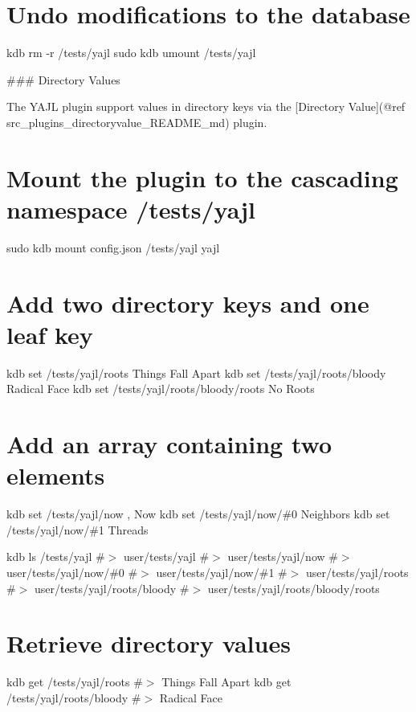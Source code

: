 \section*{Undo modifications to the database}

kdb rm -\/r /tests/yajl sudo kdb umount /tests/yajl 
\begin{DoxyCode}
### Directory Values

The YAJL plugin support values in directory keys via the [Directory Value](@ref
       src\_plugins\_directoryvalue\_README\_md) plugin.
\end{DoxyCode}
 \section*{Mount the plugin to the cascading namespace {\ttfamily /tests/yajl}}

sudo kdb mount config.\+json /tests/yajl yajl

\section*{Add two directory keys and one leaf key}

kdb set /tests/yajl/roots \textquotesingle{}Things Fall Apart\textquotesingle{} kdb set /tests/yajl/roots/bloody \textquotesingle{}Radical Face\textquotesingle{} kdb set /tests/yajl/roots/bloody/roots \textquotesingle{}No Roots\textquotesingle{}

\section*{Add an array containing two elements}

kdb set /tests/yajl/now \textquotesingle{}, Now\textquotesingle{} kdb set /tests/yajl/now/\#0 \textquotesingle{}Neighbors\textquotesingle{} kdb set /tests/yajl/now/\#1 \textquotesingle{}Threads\textquotesingle{}

kdb ls /tests/yajl \#$>$ user/tests/yajl \#$>$ user/tests/yajl/now \#$>$ user/tests/yajl/now/\#0 \#$>$ user/tests/yajl/now/\#1 \#$>$ user/tests/yajl/roots \#$>$ user/tests/yajl/roots/bloody \#$>$ user/tests/yajl/roots/bloody/roots

\section*{Retrieve directory values}

kdb get /tests/yajl/roots \#$>$ Things Fall Apart kdb get /tests/yajl/roots/bloody \#$>$ Radical Face

